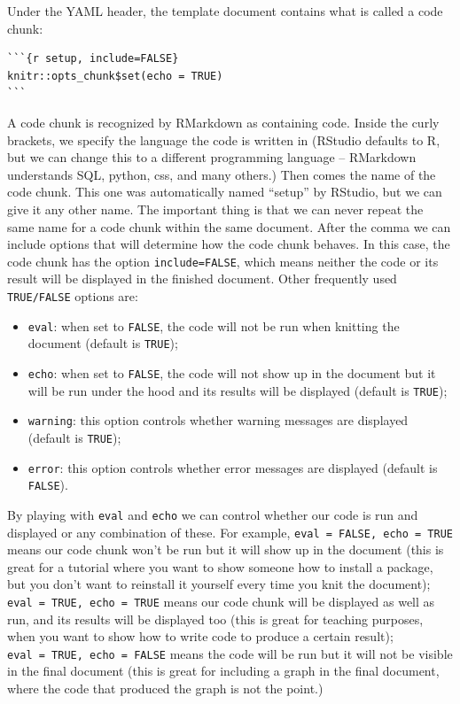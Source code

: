 \documentclass[
]{book}
\providecommand{\tightlist}{%
  \setlength{\itemsep}{0pt}\setlength{\parskip}{0pt}}
\begin{document}
Under the YAML header, the template document contains what is called a code
chunk:

\begin{verbatim}
```{r setup, include=FALSE}
knitr::opts_chunk$set(echo = TRUE)
```
\end{verbatim}

A code chunk is recognized by RMarkdown as containing code. Inside the curly
brackets, we specify the language the code is written in (RStudio defaults to R,
but we can change this to a different programming language -- RMarkdown
understands SQL, python, css, and many others.) Then comes the name of the code
chunk. This one was automatically named ``setup'' by RStudio, but we can give it
any other name. The important thing is that we can never repeat the same name
for a code chunk within the same document. After the comma we can include
options that will determine how the code chunk behaves. In this case, the code
chunk has the option \texttt{include=FALSE}, which means neither the code or its result
will be displayed in the finished document. Other frequently used \texttt{TRUE/FALSE}
options are:

\begin{itemize}
\tightlist
\item
  \texttt{eval}: when set to \texttt{FALSE}, the code will not be run when knitting the
  document (default is \texttt{TRUE});
\item
  \texttt{echo}: when set to \texttt{FALSE}, the code will not show up in the document but
  it will be run under the hood and its results will be displayed (default is
  \texttt{TRUE});
\item
  \texttt{warning}: this option controls whether warning messages are displayed
  (default is \texttt{TRUE});
\item
  \texttt{error}: this option controls whether error messages are displayed (default is
  \texttt{FALSE}).
\end{itemize}

By playing with \texttt{eval} and \texttt{echo} we can control whether our code is run and
displayed or any combination of these. For example, \texttt{eval\ =\ FALSE,\ echo\ =\ TRUE}
means our code chunk won't be run but it will show up in the document (this
is great for a tutorial where you want to show someone how to install a package,
but you don't want to reinstall it yourself every time you knit the document);
\texttt{eval\ =\ TRUE,\ echo\ =\ TRUE} means our code chunk will be displayed as well as run,
and its results will be displayed too (this is great for teaching purposes, when
you want to show how to write code to produce a certain result);
\texttt{eval\ =\ TRUE,\ echo\ =\ FALSE} means the code will be run but it will not be
visible in the final document (this is great for including a graph in the final
document, where the code that produced the graph is not the point.)
\end{document}
